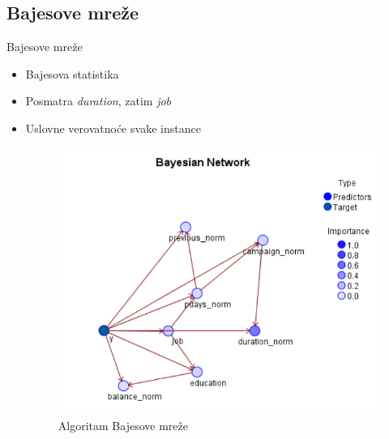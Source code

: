 \documentclass{beamer}
\begin{document}
\subsection{Bajesove mreže}

\begin{frame}{Bajesove mreže}
    \begin{itemize}
        \item Bajesova statistika
        \item Posmatra \textit{duration}, zatim \textit{job}
        \item Uslovne verovatnoće svake instance
        \begin{figure}[h!]
                \begin{center}
                \includegraphics[scale=0.40]{Bajes_mreza.png}
                \end{center}
                \caption{Algoritam Bajesove mreže}
     	\end{figure}
    \end{itemize}
\end{frame}
\end{document}
